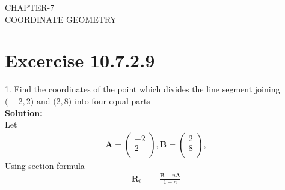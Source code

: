 \documentclass[12pt]{article}
\newcommand{\solution}{\noindent \textbf{Solution: }}
\newcommand{\myvec}[1]{\ensuremath{\begin{pmatrix}#1\end{pmatrix}}}
\let\vec\mathbf
\begin{document}
\begin{center}
\textbf\large{CHAPTER-7 \\ COORDINATE GEOMETRY}
\end{center}
\section*{Excercise 10.7.2.9}

1. Find the coordinates of the point which divides the line segment joining $\vec(-2,2) \text{ and } \vec(2,8)$ into four equal parts
\\
\solution\\		
\fi
Let 
\begin{align}
\vec{A}=\myvec{-2\\2\\},
\vec{B}=\myvec{2\\8\\},
\end{align}
Using section formula 
\begin{align}
\vec{R}_i&=\frac{\vec{B}+n\vec{A}}{1+n}
\end{align}
\end{document}

